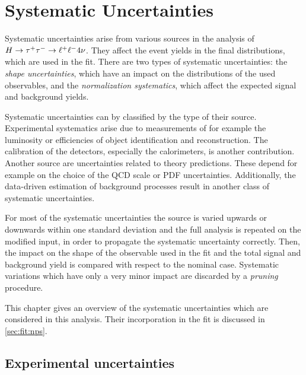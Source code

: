 \chapter{Systematic Uncertainties}\label{cha:systematics}

Systematic uncertainties arise from various sources in the analysis of $H \to \tau^+\tau^- \to \ell^+\ell^- 4\nu$.
They affect the event yields in the final distributions, which are used in the fit.
There are two types of systematic uncertainties: the \emph{shape uncertainties}, which have an impact on
the distributions of the used observables, and the \emph{normalization systematics}, which affect the
expected signal and background yields.

Systematic uncertainties can by classified by the type of their source.
Experimental systematics arise due to measurements of for example the luminosity or
efficiencies of object identification and reconstruction.
The calibration of the detectors, especially the calorimeters, is another contribution.
Another source are uncertainties related to theory predictions.
These depend for example on the choice of the QCD scale or PDF uncertainties.
Additionally, the data-driven estimation of background processes result in another class of systematic uncertainties.

For most of the systematic uncertainties the source is varied upwards or downwards within one standard deviation and the full
analysis is repeated on the modified input, in order to propagate the systematic uncertainty correctly.
Then, the impact on the shape of the observable used in the fit and the total signal and background yield is compared
with respect to the nominal case.
Systematic variations which have only a very minor impact are discarded by a \emph{pruning} procedure.

This chapter gives an overview of the systematic uncertainties which are considered in this analysis.
Their incorporation in the fit is discussed in \cref{sec:fit:nps}.

\section{Experimental uncertainties}\label{sec:systematics:exp}

